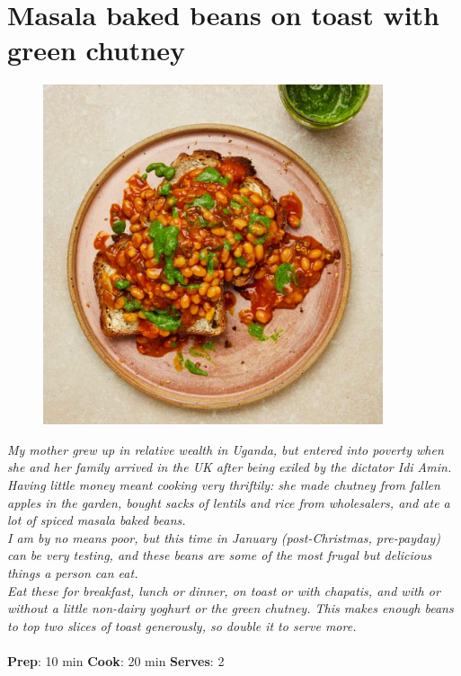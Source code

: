 \documentclass{book}
\begin{document}
\section{Masala baked beans on toast with green chutney}
\begin{figure}
\centering\includegraphics[width=10cm,height=10cm,keepaspectratio]{Recipe_Pictures/Masala_baked_beans_on_toast_with_green_chutney.png}
\end{figure}
\emph{My mother grew up in relative wealth in Uganda, but entered into poverty when she and her family arrived in the UK after being exiled by the dictator Idi Amin. \\ 
Having little money meant cooking very thriftily: she made chutney from fallen apples in the garden, bought sacks of lentils and rice from wholesalers, and ate a lot of spiced masala baked beans. \\ 
I am by no means poor, but this time in January (post-Christmas, pre-payday) can be very testing, and these beans are some of the most frugal but delicious things a person can eat.\\ 
Eat these for breakfast, lunch or dinner, on toast or with chapatis, and with or without a little non-dairy yoghurt or the green chutney. This makes enough beans to top two slices of toast generously, so double it to serve more.}\\\\ 
\textbf{Prep}: 10 min
\textbf{Cook}: 20 min
\textbf{Serves}: 2
\end{document}
